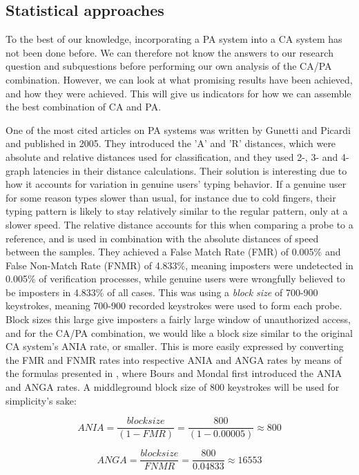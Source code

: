 \documentclass[informationsecurity]{gucmasterproject}
\begin{document}
\subsection{Statistical approaches}
To the best of our knowledge, incorporating a PA system into a CA system has not been done before. 
We can therefore not know the answers to our research question and subquestions before performing our own analysis of the CA/PA combination.
However, we can look at what promising results have been achieved, and how they were achieved.
This will give us indicators for how we can assemble the best combination of CA and PA.

One of the most cited articles on PA systems was written by Gunetti and Picardi \cite{gnp} and published in 2005.
They introduced the 'A' and 'R' distances, which were absolute and relative distances used for classification, and they used 2-, 3- and 4-graph latencies in their distance calculations.
Their solution is interesting due to how it accounts for variation in genuine users' typing behavior.
If a genuine user for some reason types slower than usual, for instance due to cold fingers, their typing pattern is likely to stay relatively similar to the regular pattern, only at a slower speed.
The relative distance accounts for this when comparing a probe to a reference, and is used in combination with the absolute distances of speed between the samples.
They achieved a False Match Rate (FMR) of 0.005\% and False Non-Match Rate (FNMR) of 4.833\%, meaning imposters were undetected in 0.005\% of verification processes, while genuine users were wrongfully believed to be imposters in 4.833\% of all cases. 
This was using a \textit{block size} of 700-900 keystrokes, meaning 700-900 recorded keystrokes were used to form each probe.
Block sizes this large give imposters a fairly large window of unauthorized access, and for the CA/PA combination, we would like a block size similar to the original CA system's ANIA rate, or smaller.
This is more easily expressed by converting the FMR and FNMR rates into respective ANIA and ANGA rates by means of the formulas presented in \cite{CA-performance}, where Bours and Mondal first introduced the ANIA and ANGA rates.
A middleground block size of 800 keystrokes will be used for simplicity's sake:

\begin{equation}
ANIA = \frac{block size}{(1-FMR)} = \frac{800}{(1-0.00005)} \approx 800
\end{equation}

\begin{equation}
ANGA = \frac{block size}{FNMR} = \frac{800}{0.04833} \approx 16553
\end{equation}
\end{document}
